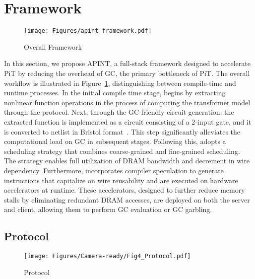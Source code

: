 \section{\sysname Framework}

\begin{figure}[t]
    \vspace{-0.2in}
    \centering
    \texttt{[image: Figures/apint\_framework.pdf]}
    \caption{Overall \sysname Framework}
    \vspace{-0.2in}
    \label{fig:APINT_framework}
\end{figure}

In this section, we propose APINT, a full-stack framework designed to accelerate PiT by reducing the overhead of GC, the primary bottleneck of PiT. The overall workflow is illustrated in Figure~\ref{fig:APINT_framework}, distinguishing between compile-time and runtime processes.
In the initial compile time stage, \sysname begins by extracting nonlinear function operations in the process of computing the transformer model through the \sysname protocol. Next, through the GC-friendly circuit generation, the extracted function is implemented as a circuit consisting of a 2-input gate, and it is converted to netlist in Bristol format~\cite{tillich2016circuits}.
This step significantly alleviates the computational load on GC in subsequent stages. Following this, \sysname adopts a scheduling strategy that combines coarse-grained and fine-grained scheduling. The strategy enables full utilization of DRAM bandwidth and decrement in wire dependency. Furthermore, \sysname incorporates compiler speculation to generate instructions that capitalize on wire reusability and are executed on hardware accelerators at runtime. These accelerators, designed to further reduce memory stalls by eliminating redundant DRAM accesses, are deployed on both the server and client, allowing them to perform GC evaluation or GC garbling.

\subsection{\sysname Protocol}

\begin{figure}[t]
    \vspace{-0.2in}
    \centering
    \texttt{[image: Figures/Camera-ready/Fig4\_Protocol.pdf]}
    \caption{\sysname Protocol}
    \vspace{-0.2in}
    \label{fig:APINT_protocol}
\end{figure}

